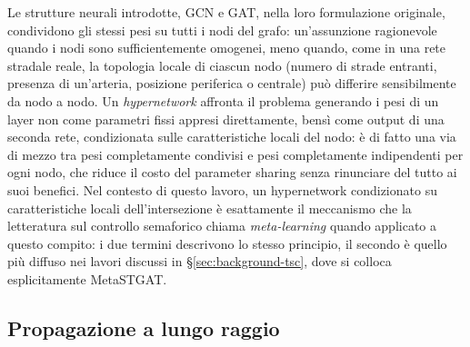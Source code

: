 Le strutture neurali introdotte, GCN e GAT, nella loro formulazione originale, condividono gli
stessi pesi su tutti i nodi del grafo: un'assunzione ragionevole
quando i nodi sono sufficientemente omogenei, meno quando, come in una
rete stradale reale, la topologia locale di ciascun nodo (numero di
strade entranti, presenza di un'arteria, posizione periferica o centrale)
può differire sensibilmente da nodo a nodo.
Un \emph{hypernetwork} \citep{ha2016hypernetworks} affronta il problema
generando i pesi di un layer non come parametri
fissi appresi direttamente, bensì come output di una seconda rete,
condizionata sulle caratteristiche locali del nodo: è di fatto una via di
mezzo tra pesi completamente condivisi e pesi completamente indipendenti
per ogni nodo, che riduce il costo del parameter sharing senza rinunciare
del tutto ai suoi benefici. Nel contesto di questo lavoro, un hypernetwork
condizionato su caratteristiche locali dell'intersezione è esattamente il
meccanismo che la letteratura sul controllo semaforico chiama
\emph{meta-learning} quando applicato a questo compito: i due termini
descrivono lo stesso principio, il secondo è quello più diffuso nei
lavori discussi in §\ref{sec:background-tsc}, dove si colloca
esplicitamente MetaSTGAT.

\subsection{Propagazione a lungo raggio}

